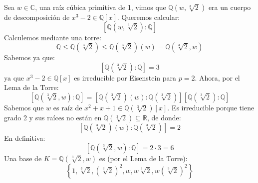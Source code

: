 \begin{ejemplo}
    Sea $w\in \mathbb{C}$, una raíz cúbica primitiva de 1, vimos que $\mathbb{Q}\left(w,\sqrt[3]{2}\right)$ era un cuerpo de descomposición de $x^3-2\in \mathbb{Q}[x]$. Queremos calcular:
    \begin{equation*}
        \left[\mathbb{Q}\left(w, \sqrt[3]{2}\right):\mathbb{Q}\right]
    \end{equation*}
    Calculemos mediante una torre:
    \begin{equation*}
        \mathbb{Q} \leq \mathbb{Q}\left(\sqrt[3]{2}\right) \leq \mathbb{Q}\left(\sqrt[3]{2}\right)(w) = \mathbb{Q}\left(\sqrt[3]{2}, w\right)
    \end{equation*}
    Sabemos ya que:
    \begin{equation*}
        \left[\mathbb{Q}\left(\sqrt[3]{2}\right):\mathbb{Q}\right] = 3
    \end{equation*}
    ya que $x^3-2\in \mathbb{Q}[x]$  es irreducible por Eisenstein para $p=2$. Ahora, por el Lema de la Torre:
    \begin{equation*}
        \left[\mathbb{Q}\left(\sqrt[3]{2},w\right):\mathbb{Q}\right] = \left[\mathbb{Q}\left(\sqrt[3]{2}\right)(w) : \mathbb{Q}\left(\sqrt[3]{2}\right)\right]\left[\mathbb{Q}\left(\sqrt[3]{2}\right):\mathbb{Q}\right]
    \end{equation*}
    Sabemos que $w$ es raíz de $x^2+x+1\in \mathbb{Q}\left(\sqrt[3]{2}\right)[x]$. Es irreducible porque tiene grado 2 y sus raíces no están en $\mathbb{Q}\left(\sqrt[3]{2}\right)\subseteq \mathbb{R}$, de donde:
    \begin{equation*}
        \left[\mathbb{Q}\left(\sqrt[3]{2}\right)(w) : \mathbb{Q}\left(\sqrt[3]{2}\right)\right] = 2
    \end{equation*}
    En definitiva:
    \begin{equation*}
        \left[\mathbb{Q}\left(\sqrt[3]{2},w\right):\mathbb{Q}\right] = 2\cdot 3 = 6
    \end{equation*}
    Una base de $K=\mathbb{Q}\left(\sqrt[3]{2},w\right)$ es (por el Lema de la Torre):
    \begin{equation*}
        \left\{1, \sqrt[3]{2}, {\left(\sqrt[3]{2}\right)}^{2}, w, w\sqrt[3]{2}, w{\left(\sqrt[3]{2}\right)}^{2}\right\}
    \end{equation*}
\end{ejemplo}

